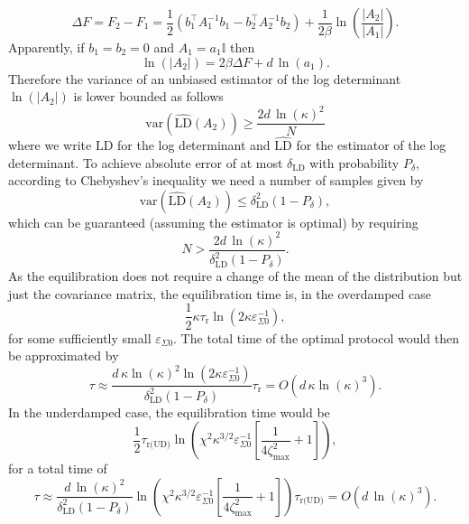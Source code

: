 \documentclass[prx,onecolumn,floatfix,longbibliography,notitlepage, nofootinbib]{revtex4-1}
\renewcommand{\geq}{\geqslant}
\renewcommand{\leq}{\leqslant}
\begin{document}
\begin{appendix}
\begin{equation}
    \Delta F = F_2 - F_1 = \frac{1}{2}(b_1^\intercal A_1^{-1}b_1-b_2^\intercal A_2^{-1}b_2) + \frac{1}{2\beta} \ln \left( \frac{\left|A_2\right|}{\left|A_1\right|}\right).
\end{equation}
Apparently, if $b_1 = b_2 = 0$ and $A_1 = a_1 \mathbb{I} $ then
\begin{equation}
    \ln\left(\left|A_2\right|\right)= 2\beta \Delta F +  d\, \ln(a_1). 
\end{equation}
Therefore the variance of an unbiased estimator of the log determinant $\ln(\left|A_2\right|)$ is lower bounded as follows
\begin{equation}
    \text{var}(\widehat{\text{LD}}(A_2)) \geq \frac{2 d\,\ln(\kappa)^2}{N}
\end{equation}
where we write $\text{LD}$ for the log determinant and $\widehat{\text{LD}}$ for the estimator of the log determinant. To achieve absolute error of at most $\delta_\text{LD}$ with probability $P_\delta$, according to Chebyshev's inequality we need a number of samples given by
\begin{equation}
    \text{var}(\widehat{\text{LD}}(A_2)) \leq \delta_\text{LD}^2 (1-P_\delta),
\end{equation}
which can be guaranteed (assuming the estimator is optimal) by requiring
\begin{equation}
    N> \frac{2 d\, \ln(\kappa)^2}{\delta^2_\text{LD}(1-P_\delta)}.
\end{equation}
As the equilibration does not require a change of the mean of the distribution but just the covariance matrix, the equilibration time is, in the overdamped case
\begin{equation}
\frac{1}{2} \kappa \tau_\text{r}\ln\left(2\kappa\varepsilon_{\Sigma 0}^{-1}\right),
\end{equation}
for some sufficiently small $\varepsilon_{\Sigma 0}$. The total time of the optimal protocol would then be approximated by
\begin{equation}
\tau \approx \frac{ d\, \kappa \ln(\kappa)^2\ln(2 \kappa\varepsilon^{-1}_{\Sigma0})}{\delta^2_\text{LD}(1-P_\delta)} \tau_\text{r} = O(d \, \kappa \ln(\kappa)^3).
\end{equation}
In the underdamped case, the equilibration time would be
\begin{equation}
\frac{1}{2} \tau_\text{r(UD)}\ln\left(\chi^2 \kappa^{3/2}\varepsilon_{\Sigma0}^{-1}\left[\frac{1}{4\zeta_\text{max}^{2}}+1\right]\right),
\end{equation}
for a total time of
\begin{equation}
\tau \approx \frac{ d\,\ln(\kappa)^2}{\delta^2_\text{LD}(1-P_\delta)} \ln\left(\chi^2 \kappa^{3/2}\varepsilon_{\Sigma0}^{-1}\left[\frac{1}{4\zeta_\text{max}^{2}}+1\right]\right)
\tau_\text{r(UD)} = O(d \, \ln(\kappa)^3).
\end{equation}





\end{appendix}
\end{document}
